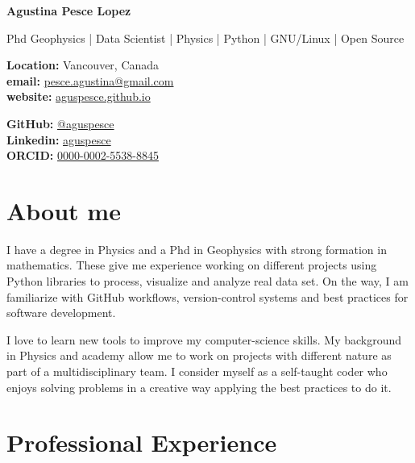 \documentclass[10pt, a4paper]{article}
\makeatletter
\newcommand{\firstname}{Agustina}
\newcommand{\familyname}{Pesce Lopez}
\newcommand{\email}{pesce.agustina@gmail.com}
\newcommand{\website}{aguspesce.github.io}
\newcommand{\github}{aguspesce}
\newcommand{\linkedin}{aguspesce}
\newcommand{\orcid}{0000-0002-5538-8845}
\newcommand{\fullname}{\firstname{} \familyname}
\newcommand{\maintitle}[1]{
    \begin{center}
        \textbf{\Huge #1}
    \end{center}
}
\newcommand{\subtitle}[1]{
    \begin{center}
        {\large #1}
    \end{center}
}
\newcommand{\affiliation}[1]{
    \begin{center}
        {#1}
    \end{center}
}
\newcommand{\entriespad}{0.75em}
\newcommand{\MAIL}[1]{\href{mailto:#1}{#1}}
\newcommand{\GITHUB}[1]{\href{https://github.com/#1}{@#1}}
\newcommand{\ORCID}[1]{\href{https://orcid.org/#1}{#1}}
\newcommand{\WEBSITE}[1]{\href{https://#1}{#1}}
\newcommand{\LINKEDIN}[1]{\href{https://linkedin.com/in/#1}{#1}}
\makeatother
\begin{document}
\maintitle{\fullname}
\subtitle{Phd Geophysics | Data Scientist | Physics | Python | GNU/Linux | Open
Source}
\vspace{\entriespad}

\begin{minipage}[t]{0.60\linewidth}
    \begin{flushleft}
        \textbf{Location:} Vancouver, Canada
        \\
        \textbf{email:} \MAIL{\email}
        \\
        \textbf{website:} \WEBSITE{\website}
    \end{flushleft}
\end{minipage}
\hfill
\begin{minipage}[t]{0.40\linewidth}
    \begin{flushright}
        \textbf{GitHub:} \GITHUB{\github}
        \\
        \textbf{Linkedin:} \LINKEDIN{\linkedin}
        \\
        \textbf{ORCID:} \ORCID{\orcid}
    \end{flushright}
\end{minipage}

\vspace{\entriespad}


\section{About me}

I have a degree in Physics and a Phd in Geophysics with strong formation in
mathematics.
These give me experience working on different projects using Python libraries
to process, visualize and analyze real data set.
On the way, I am familiarize with GitHub workflows, version-control systems and
best practices for software development.

I love to learn new tools to improve my computer-science skills.
My background in Physics and academy allow me to work on projects with
different nature as part of a multidisciplinary team.
I consider myself as a self-taught coder who enjoys solving problems in a
creative way applying the best practices to do it.


\section{Professional Experience}
\end{document}
